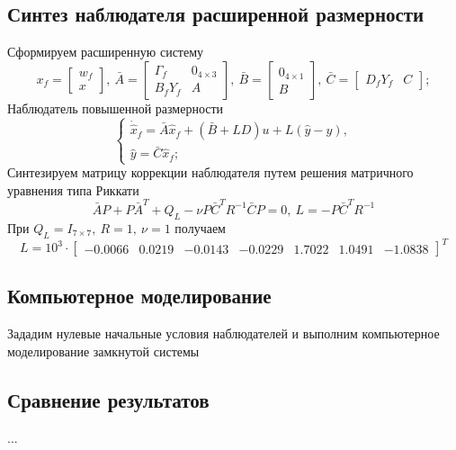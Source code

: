\documentclass[a4paper, 12pt]{article}
\begin{document}
    \subsection{Синтез наблюдателя расширенной размерности}
    Сформируем расширенную систему
    $$
    x_f=\begin{bmatrix}
        w_f\\
        x
    \end{bmatrix},\ \bar{A}=\begin{bmatrix}
        \Gamma_f &0_{4\times3}\\
        B_fY_f &A
    \end{bmatrix},\ \bar{B}=\begin{bmatrix}
        0_{4\times1}\\B
    \end{bmatrix},\ \bar{C}=\begin{bmatrix}
        D_fY_f &C
    \end{bmatrix};
    $$
    Наблюдатель повышенной размерности
    $$
    \begin{cases}
        \dot{\hat{x}}_f=\bar{A}\hat{x}_f+\left( \bar{B}+LD \right)u+L\left( \hat{y}-y \right),\\
        \hat{y}=\bar{C}\hat{x}_f;
    \end{cases}
    $$
    Синтезируем матрицу коррекции наблюдателя путем решения матричного уравнения
    типа Риккати
    $$
    \bar{A}P+P\bar{A}^T+Q_{L}-\nu P\bar{C}^TR^{-1}\bar{C}P=0,\ L=-P\bar{C}^TR^{-1}
    $$
    При $Q_{L}=I_{7\times7},\ R=1,\ \nu=1$ получаем
    $$
    L=10^3\cdot\begin{bmatrix}
    -0.0066&
    0.0219&
   -0.0143&
   -0.0229&
    1.7022&
    1.0491&
   -1.0838
    \end{bmatrix}^T
    $$


    \subsection{Компьютерное моделирование}
    Зададим нулевые начальные условия наблюдателей и выполним компьютерное моделирование замкнутой системы


    \subsection{Сравнение результатов}
    ...
\end{document}
